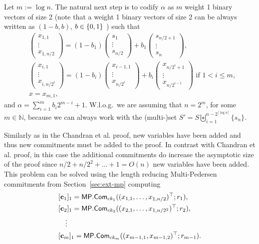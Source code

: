 Let $m:=\log n$. The natural next step is to codify $\alpha$ as $m$ weight 1 binary vectors of size 2 (note that a weight 1 binary vectors of size 2 can be always written as $(1-b,b)$, $b\in\{0,1\}$ ) such that
\begin{align}
&\begin{pmatrix}
x_{1,1}\\\vdots\\ x_{1,n/2}
\end{pmatrix}
=
(1-b_1)
\begin{pmatrix}
s_1\\\vdots\\ s_{n/2}
\end{pmatrix}
+
b_1
\begin{pmatrix}
s_{n/2+1}\\\vdots\\ s_{n}
\end{pmatrix},\label{eq-log-1}\\
&\begin{pmatrix}
x_{i,1}\\\vdots\\x_{i,n/{2^i}}
\end{pmatrix}
=
(1-b_i)
\begin{pmatrix}
x_{i-1,1}\\\vdots\\x_{n/{2^i}}
\end{pmatrix}
+
b_i
\begin{pmatrix}
x_{n/{2^i}+1}\\\vdots\\x_{n/{2^{i-1}}}
\end{pmatrix}
\text{ if } 1 <  i \leq m,\label{eq-log-2}\\
&
x= x_{m,1}\label{eq-log-3},
\end{align}
and $\alpha=\sum_{i=1}^{m}b_i2^{m-i}+1$.
W.l.o.g.~we are assuming that $n=2^m$, for some $m\in\mathbb{N}$, because we can always work with the (multi-)set $S'=S\biguplus_{i=1}^{n-2^{\lceil \log n \rceil}}\{s_n\}$.

Similarly as in the Chandran et al. proof, new variables have been added and thus new commitments must be added to the proof. In contrast with Chandran et al. proof, in this case the additional commitments do increase the asymptotic size of the proof since $n/2+n/2^2+\ldots+1=O(n)$ new variables have been added. This problem can be solved using the length reducing Multi-Pedersen commitments from Section~\ref{sec:ext-mp} computing
\begin{align*}
&[\mathbf{c}_1]_1=\mathsf{MP}.\mathsf{Com}_{ck_1}((x_{1,1},\ldots,x_{1,n/2})^\top;r_1),\\
&[\mathbf{c}_2]_1=\mathsf{MP}.\mathsf{Com}_{ck_2}((x_{2,1},\ldots,x_{1,n/2^2})^\top;r_2),\\
&\quad\vdots\\
&[\mathbf{c}_{m}]_1=\mathsf{MP}.\mathsf{Com}_{ck_{m}}((x_{m-1,1},x_{m-1,2})^\top;r_{m-1}).
\end{align*}

